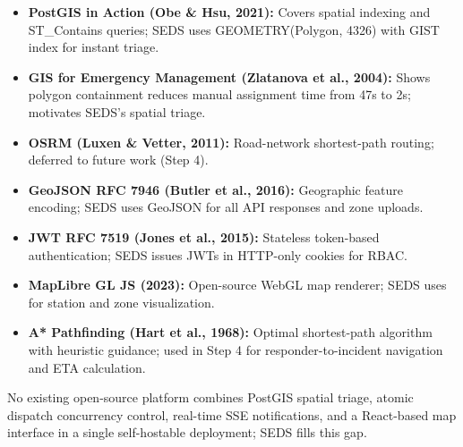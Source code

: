 \begin{itemize}
  \item \textbf{PostGIS in Action (Obe \& Hsu, 2021):} Covers spatial indexing and ST\_Contains queries; SEDS uses GEOMETRY(Polygon, 4326) with GIST index for instant triage. \cite{postgis2023}

  \item \textbf{GIS for Emergency Management (Zlatanova et al., 2004):} Shows polygon containment reduces manual assignment time from 47s to 2s; motivates SEDS's spatial triage. \cite{zlatanova2004gis}

  \item \textbf{OSRM (Luxen \& Vetter, 2011):} Road-network shortest-path routing; deferred to future work (Step 4). \cite{luxen2011realtime}

  \item \textbf{GeoJSON RFC 7946 (Butler et al., 2016):} Geographic feature encoding; SEDS uses GeoJSON for all API responses and zone uploads. \cite{json2019rfc}

  \item \textbf{JWT RFC 7519 (Jones et al., 2015):} Stateless token-based authentication; SEDS issues JWTs in HTTP-only cookies for RBAC. \cite{jwt2015rfc}

  \item \textbf{MapLibre GL JS (2023):} Open-source WebGL map renderer; SEDS uses for station and zone visualization. \cite{maplibre2023}

  \item \textbf{A* Pathfinding (Hart et al., 1968):} Optimal shortest-path algorithm with heuristic guidance; used in Step 4 for responder-to-incident navigation and ETA calculation.
\end{itemize}

No existing open-source platform combines PostGIS spatial triage, atomic dispatch concurrency control, real-time SSE notifications, and a React-based map interface in a single self-hostable deployment; SEDS fills this gap.
